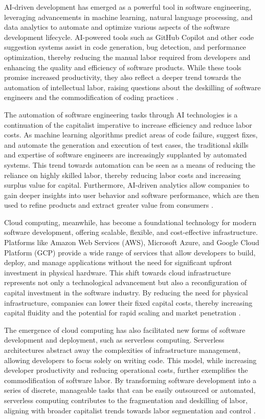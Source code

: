 \begin{refsection}
AI-driven development has emerged as a powerful tool in software engineering, leveraging advancements in machine learning, natural language processing, and data analytics to automate and optimize various aspects of the software development lifecycle. AI-powered tools such as GitHub Copilot and other code suggestion systems assist in code generation, bug detection, and performance optimization, thereby reducing the manual labor required from developers and enhancing the quality and efficiency of software products. While these tools promise increased productivity, they also reflect a deeper trend towards the automation of intellectual labor, raising questions about the deskilling of software engineers and the commodification of coding practices \cite[pp.~87-89]{mcconnell2004code}.

The automation of software engineering tasks through AI technologies is a continuation of the capitalist imperative to increase efficiency and reduce labor costs. As machine learning algorithms predict areas of code failure, suggest fixes, and automate the generation and execution of test cases, the traditional skills and expertise of software engineers are increasingly supplanted by automated systems. This trend towards automation can be seen as a means of reducing the reliance on highly skilled labor, thereby reducing labor costs and increasing surplus value for capital. Furthermore, AI-driven analytics allow companies to gain deeper insights into user behavior and software performance, which are then used to refine products and extract greater value from consumers \cite[pp.~47-50]{parnas1972criteria}.

Cloud computing, meanwhile, has become a foundational technology for modern software development, offering scalable, flexible, and cost-effective infrastructure. Platforms like Amazon Web Services (AWS), Microsoft Azure, and Google Cloud Platform (GCP) provide a wide range of services that allow developers to build, deploy, and manage applications without the need for significant upfront investment in physical hardware. This shift towards cloud infrastructure represents not only a technological advancement but also a reconfiguration of capital investment in the software industry. By reducing the need for physical infrastructure, companies can lower their fixed capital costs, thereby increasing capital fluidity and the potential for rapid scaling and market penetration \cite[pp.~50-53]{armbrust2010view}.

The emergence of cloud computing has also facilitated new forms of software development and deployment, such as serverless computing. Serverless architectures abstract away the complexities of infrastructure management, allowing developers to focus solely on writing code. This model, while increasing developer productivity and reducing operational costs, further exemplifies the commodification of software labor. By transforming software development into a series of discrete, manageable tasks that can be easily outsourced or automated, serverless computing contributes to the fragmentation and deskilling of labor, aligning with broader capitalist trends towards labor segmentation and control \cite[pp.~103-105]{fowler2014patterns}.


\end{refsection}
